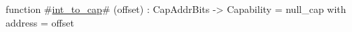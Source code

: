 function #\hyperref[sailRISCVzintzytozycap]{int\_to\_cap}# (offset) : CapAddrBits -> Capability =
    {null_cap with address = offset}
